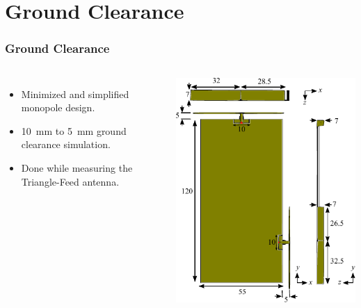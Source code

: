\section{Ground Clearance}
\def\legendfooter{\scriptsize{Upper: Top antenna. Lower: Side antenna. \textcolor{bb}{Monopole Sim}, \textcolor{gg}{Monopole Meas}, \textcolor{rr}{Triangle-Feed Meas}, Frequency in MHz.}}
\def\emptyline{\textcolor{white}{Empty}}

\begin{frame}[fragile]
  \frametitle{Ground Clearance}
  \begin{columns}[onlytextwidth,t]
      \begin{itemize}
      \item Minimized and simplified monopole design.
      \item \SI{10}{mm} to \SI{5}{mm} ground clearance simulation.
      \item Done while measuring the Triangle-Feed antenna.
      \end{itemize}
    \begin{center}
      \includegraphics[scale=0.7]{img/Lasse/3d_drawing_mini.pdf}
    \end{center}
  \end{columns}
\end{frame}

